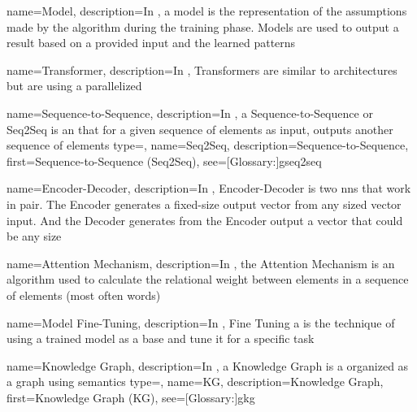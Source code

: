 
{
  name={Model},
  description={In , a model is the representation of the assumptions made by the algorithm during the training phase. Models are used to output a result based on a provided input and the learned patterns}
}

{
  name={Transformer},
  description={In , Transformers are similar to  architectures but are using a parallelized }
}

{
  name={Sequence-to-Sequence},
  description={In , a Sequence-to-Sequence or Seq2Seq is an   that for a given sequence of elements as input, outputs another sequence of elements}
}
{
  type=\acronymtype,
  name={Seq2Seq},
  description={Sequence-to-Sequence},
  first={Sequence-to-Sequence (Seq2Seq)},
  see=[Glossary:]{gseq2seq}
}

{
  name={Encoder-Decoder},
  description={In , Encoder-Decoder is two \glspl{nn} that work in pair. The Encoder generates a fixed-size output vector from any sized vector input. And the Decoder generates from the Encoder output a vector that could be any size}
}

{
  name={Attention Mechanism},
  description={In , the Attention Mechanism is an algorithm used to calculate the relational weight between elements in a sequence of elements (most often words)}
}

{
  name={Model Fine-Tuning},
  description={In , Fine Tuning a  is the technique of using a trained  model as a base and tune it for a specific task}
}

{
  name={Knowledge Graph},
  description={In , a Knowledge Graph is a  organized as a graph using semantics}
}
{
  type=\acronymtype,
  name={KG},
  description={Knowledge Graph},
  first={Knowledge Graph (KG)},
  see=[Glossary:]{gkg}
}

